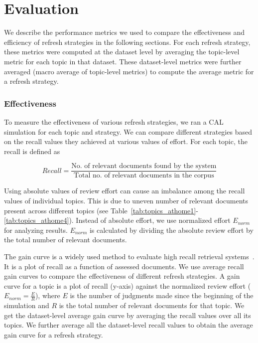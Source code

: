 \section{Evaluation}
\label{sec:eval}

We describe the performance metrics we used to compare the
effectiveness and efficiency of refresh strategies in the following sections.
For each refresh strategy, these metrics were computed at the dataset level by
averaging the topic-level metric for each topic in that dataset. These
dataset-level metrics were further averaged (macro average of topic-level
metrics) to compute the average metric for a refresh strategy.

\subsubsection{Effectiveness}
To measure the effectiveness of various refresh strategies, we ran a CAL simulation for
each topic and strategy. We can compare different strategies based on the recall
values they achieved at various values of effort. For each topic, the recall is
defined as

\begin{equation}
    Recall = \frac{\text{No. of relevant documents found by the system}}{\text{Total no. of
    relevant documents in the corpus}}
\end{equation}

Using absolute values of review effort can cause an imbalance among the recall
values of individual topics. This is due to uneven number of relevant documents
present across different topics (see
Table~\ref{tab:topics_athome1}-\ref{tab:topics_athome4}). Instead of
absolute effort, we use normalized effort $E_{norm}$ for analyzing results.
$E_{norm}$ is calculated by dividing the absolute review effort by the total
number of relevant documents.

The gain curve is a widely used method to evaluate high recall retrieval
systems~\cite{roegiest2015trec,grossman2016trec,grossman2011overview}. It is a
plot of recall as a function of assessed documents. We use average recall gain
curves to compare the effectiveness of different refresh strategies.  A gain
curve for a topic is a plot of recall (y-axis) against the normalized review
effort ($E_{norm} = \frac{E}{R}$), where $E$ is the number of judgments made
since the beginning of the simulation and $R$ is the total number of relevant
documents for that topic. We get the dataset-level average gain curve by
averaging the recall values over all its topics. We further average all the
dataset-level recall values to obtain the average gain curve for a refresh
strategy.

